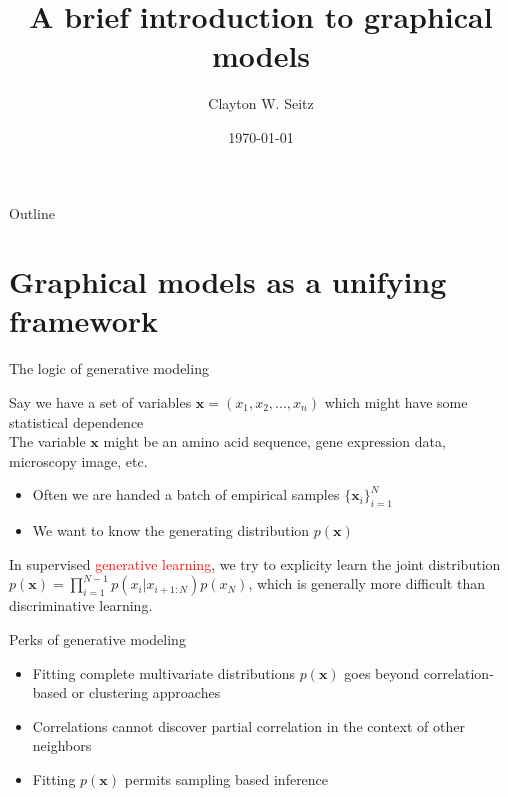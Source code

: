 \documentclass{beamer}					%
\title{A brief introduction to graphical models}	%
\author{Clayton W. Seitz}								%
\date{\today}									%
\begin{document}
\begin{frame}
  \titlepage
\end{frame}

\begin{frame}{Outline}
  \tableofcontents
\end{frame}

%


\section{Graphical models as a unifying framework}

\begin{frame}{The logic of generative modeling}

Say we have a set of variables $\mathbf{x} = (x_{1},x_{2},...,x_{n})$ which might have some statistical dependence\\
\vspace{0.1in}
The variable $\mathbf{x}$ might be an amino acid sequence, gene expression data, microscopy image, etc.\\
\vspace{0.1in}
\begin{itemize}
\item Often we are handed a batch of empirical samples $\{\mathbf{x}_{i}\}_{i=1}^{N}$
\item We want to know the generating distribution $p(\mathbf{x})$
\end{itemize}

In supervised \textcolor{red}{generative learning}, we try to explicity learn the joint distribution $p(\mathbf{x}) = \prod_{i=1}^{N-1}p(x_{i}|x_{i+1:N})p(x_{N})$, which is generally more difficult than discriminative learning. 

\end{frame}


\begin{frame}{Perks of generative modeling}

\begin{itemize}
\item Fitting complete multivariate distributions $p(\mathbf{x})$ goes beyond correlation-based or clustering approaches
\item Correlations cannot discover partial correlation in the context of other neighbors
\item Fitting $p(\mathbf{x})$ permits sampling based inference
\end{itemize}

\end{frame}
\end{document}
